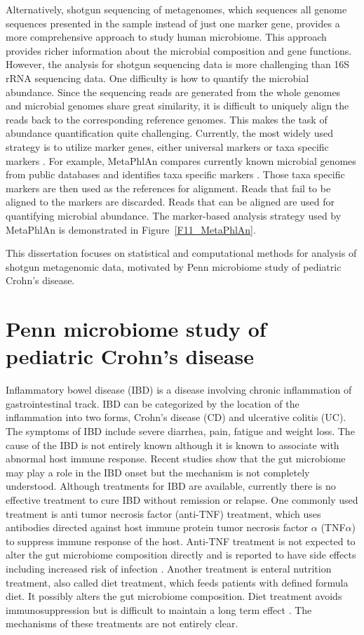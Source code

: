 Alternatively, shotgun sequencing of metagenomes, which sequences all genome sequences presented in the sample instead of just one marker gene, provides a more comprehensive approach to study human microbiome. This approach provides richer information about the microbial composition and gene functions. However, the analysis for shotgun sequencing data is more challenging than 16S rRNA sequencing data. One  difficulty is how to quantify the microbial abundance. Since the sequencing reads are generated from the whole genomes and microbial genomes share great similarity, it is difficult to uniquely align the reads back to the corresponding reference genomes. This makes the task of abundance quantification quite challenging. Currently, the most widely used strategy is to utilize  marker genes, either universal  markers \citep{Sunagawa:2013if} or taxa specific markers \citep{segata2012metagenomic}. For example, MetaPhlAn compares currently known microbial genomes from public databases and identifies taxa specific markers \citep{segata2012metagenomic}. Those taxa specific markers are then used as the references for alignment. Reads that fail to be aligned to the markers are discarded. Reads that can be aligned are used for quantifying microbial abundance. The marker-based analysis strategy used by MetaPhlAn is demonstrated in Figure~\ref{F11_MetaPhlAn}. 


This dissertation focuses  on statistical and computational methods for analysis of shotgun metagenomic data, motivated by Penn microbiome study of pediatric Crohn's disease. 


\section{Penn microbiome study of pediatric Crohn's disease}
Inflammatory bowel disease (IBD) is a disease involving chronic inflammation of gastrointestinal track. IBD can be categorized by the location of the inflammation into two forms, Crohn's disease (CD) and ulcerative colitis (UC). The symptoms of IBD include severe diarrhea, pain, fatigue and weight loss. The cause of the IBD is not entirely known although it is known to associate with abnormal host immune response. Recent studies show that the gut microbiome may play a role in the IBD onset \citep{gevers2014treatment} but the mechanism is not completely understood. Although treatments for IBD are available, currently there is no effective treatment to cure IBD without remission or relapse. One commonly used treatment is anti tumor necrosis factor (anti-TNF) treatment, which uses antibodies directed against host immune protein tumor necrosis factor $\alpha$ (TNF$\alpha$) to suppress immune response of the host. Anti-TNF treatment is not expected to alter the gut microbiome composition directly and is  reported to have side effects including increased risk of infection \citep{Borrelli:2006tk, Rutgeerts:2012ul}. Another treatment is enteral nutrition treatment, also called diet treatment, which feeds patients with defined formula diet. It possibly alters the gut microbiome composition. Diet treatment avoids immunosuppression but is difficult to maintain a long term effect \citep{Grover:2013dj}. The mechanisms of these treatments are not entirely clear.

